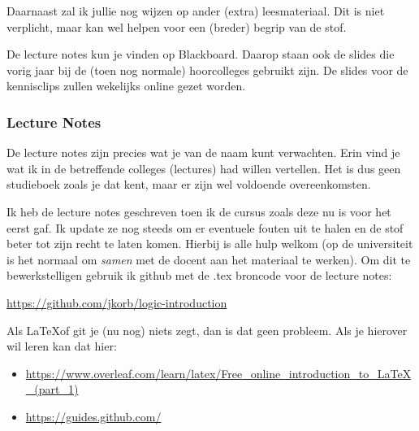 \documentclass[a4paper,11pt]{article}
\begin{document}
Daarnaast zal ik jullie nog wijzen op ander (extra) leesmateriaal. Dit is niet verplicht, maar kan wel helpen voor een (breder) begrip van de stof.  


De lecture notes kun je vinden op Blackboard. Daarop staan ook de slides die vorig jaar bij de (toen nog normale) hoorcolleges gebruikt zijn. De slides voor de kennisclips zullen wekelijks online gezet worden.

\subsubsection*{Lecture Notes}

De lecture notes zijn precies wat je van de naam kunt verwachten. Erin vind je wat ik in de betreffende colleges (lectures) had willen vertellen. Het is dus geen studieboek zoals je dat kent, maar er zijn wel voldoende overeenkomsten.


Ik heb de lecture notes geschreven toen ik de cursus zoals deze nu is voor het eerst gaf. Ik update ze nog steeds om er eventuele fouten uit te halen en de stof beter tot zijn recht te laten komen. Hierbij is alle hulp welkom (op de universiteit is het normaal om \emph{samen} met de docent aan het materiaal te werken). Om dit te bewerkstelligen gebruik ik github met de .tex broncode voor de lecture notes:
\begin{center}
  \url{https://github.com/jkorb/logic-introduction}
\end{center}

Als \LaTeX of git je (nu nog) niets zegt, dan is dat geen probleem. Als je hierover wil leren kan dat hier:

\begin{itemize}
  \item \url{https://www.overleaf.com/learn/latex/Free_online_introduction_to_LaTeX_(part_1)}

  \item \url{https://guides.github.com/}
\end{itemize}
\end{document}
